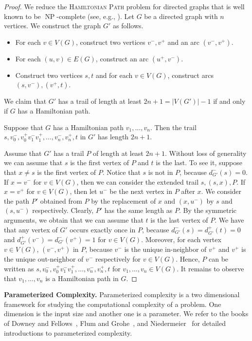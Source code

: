 \documentclass[11pt]{article}
\DeclareMathOperator{\operatorClassNP}{NP}
\newcommand{\classNP}{\ensuremath{\operatorClassNP}}
\begin{document}
\begin{proof}
We reduce the \textsc{Hamiltonian Path} problem for directed graphs that is well known to be \classNP-complete (see, e.g., \cite{GareyJ79}). Let $G$ be a directed graph with $n$ vertices. We construct the graph $G'$ as follows.
\begin{itemize}
\item For each $v\in V(G)$, construct two vertices $v^-,v^+$ and an arc $(v^-,v^+)$.
\item For each $(u,v)\in E(G)$, construct an arc $(u^+,v^-)$.
\item Construct two vertices $s,t$ and for each $v\in V(G)$, construct arcs $(s,v^-),(v^+,t)$. 
\end{itemize}
We claim that $G'$ has a trail of length at least $2n+1=|V(G')|-1$ if and only if $G$ has a Hamiltonian path.

Suppose that $G$ has a Hamiltonian path $v_1,\ldots,v_n$. Then the trail $s,v_0^-,v_0^+v_1^-v_1^+,\ldots,v_n^-,v_n^+,t$ in $G'$ has length $2n+1$.

Assume that $G'$ has a trail $P$ of 
length at least $2n+1$. Without loss of generality we can assume that $s$ is the first vertex of $P$ and $t$ is the last. To see it, suppose that $x\neq s$ is the first vertex of $P$. Notice that 
$s$ is not in $P$, because $d_{G'}^-(s)=0$. If $x=v^-$ for $v\in V(G)$, then  we can consider the extended trail $s,(s,x),P$. If  $x=v^+$ for $v\in V(G)$, then let $u^-$ be the next vertex in $P$ after $x$. We consider the path $P'$ obtained from $P$ by the replacement of $x$ and $(x,u^-)$ by $s$ and $(s,u^-)$ respectively. Clearly, $P'$ has the same length as $P$. By the symmetric arguments, we obtain that we can assume that $t$ is the last vertex of $P$. We have that any vertex of $G'$ occurs exactly once in $P$, because
$d_{G'}^-(s)=d_{G'}^+(t)=0$ and $d_{G'}^+(v^-)=d_{G'}^-(v^+)=1$ for $v\in V(G)$.    
Moreover,  for each vertex $v\in V(G)$, $(v^-,v^+)$ in $P$, because $v^-$ is the unique in-neighbor of $v^+$ and $v^+$ is the unique out-neighbor of $v^-$ respectively for $v\in V(G)$. Hence, $P$ can be written as $s,v_0^-,v_0^+v_1^-v_1^+,\ldots,v_n^-,v_n^+,t$ for $v_1,\ldots,v_n\in V(G)$. It remains to observe that $v_1,\ldots,v_n$ is a Hamiltonian path in $G$.
\end{proof}



\smallskip
\noindent
{\bf Parameterized Complexity.}
Parameterized complexity is a two dimensional framework
for studying the computational complexity of a problem. One dimension is the input size
and another one is a parameter. We refer to the books of Downey and Fellows~\cite{DowneyF13},
Flum and Grohe~\cite{FlumG06}, and   Niedermeier~\cite{Niedermeierbook06} for  detailed introductions  to parameterized complexity. 
\end{document}
